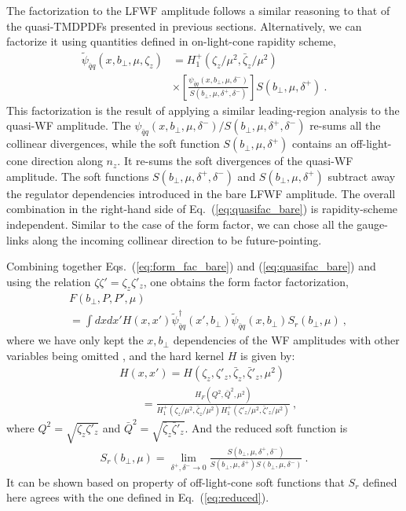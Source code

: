 \documentclass[aps,rmp,reprint,amsmath,amssymb,graphicx,longbibliography]{revtex4-1} %
\newcommand{\nn}{\nonumber}
\begin{document}
The factorization to the LFWF amplitude follows a similar reasoning to that of the quasi-TMDPDFs presented in previous sections.  Alternatively, we can factorize it using quantities defined in on-light-cone rapidity scheme,
\begin{align}\label{eq:quasifac_bare}
	\tilde \psi_{\bar q q}(x,b_\perp,\mu,\zeta_z)&=H^+_1\left(\zeta_z/\mu^2,\bar \zeta_z/\mu^2\right)\\ &\times \left[\frac{\psi_{\bar q q}(x,b_\perp,\mu,\delta^-)}{S(b_\perp,\mu,\delta^+,\delta^-)}\right]S(b_\perp,\mu,\delta^+) \ . \nn
\end{align}
This factorization is the result of applying a similar leading-region analysis to the quasi-WF amplitude. The $\psi_{\bar q q}(x,b_\perp,\mu,\delta^-)/S(b_\perp,\mu,\delta^+,\delta^-)$ re-sums all the collinear divergences, while the soft function $S(b_\perp,\mu,\delta^+)$ contains an off-light-cone direction along ${n_z}$. It re-sums the soft divergences of the quasi-WF amplitude. The soft functions $S(b_\perp,\mu,\delta^+,\delta^-)$ and $S(b_\perp,\mu,\delta^+)$ subtract away the regulator dependencies introduced in the bare LFWF amplitude. The overall combination in the right-hand side of Eq.~(\ref{eq:quasifac_bare}) is rapidity-scheme independent. Similar to the case of the form factor, we can chose all the gauge-links along the incoming collinear direction to be future-pointing.

Combining together Eqs.~(\ref{eq:form_fac_bare}) and (\ref{eq:quasifac_bare}) and using the relation $\zeta \zeta'= \zeta_z \zeta'_z$,
one obtains the form factor factorization,
\begin{align}
	& F(b_\perp,P,P',\mu)\\
	&= \int dx dx' H(x,x')\tilde \psi_{\bar q q}^{\dagger}(x',b_\perp)\tilde \psi_{\bar q q}(x,b_\perp)S_{r}(b_\perp,\mu)\ ,\nn
\end{align}
where we have only kept the $x,b_\perp$ dependencies of the WF amplitudes with other variables being omitted
, and the hard kernel $H$ is given by:
\begin{align}
	&H(x,x')=H(\zeta_z,\zeta'_z,\bar \zeta_z,\bar \zeta'_z,\mu^2)\nonumber \\
	&\qquad=\frac{H_F(Q^2,\bar Q^2,\mu^2)}{H^+_1\left(\zeta_z/\mu^2,\bar \zeta_z/\mu^2\right)H^+_1\left(\zeta'_z/\mu^2,\bar \zeta'_z/\mu^2\right)} \ ,
\end{align}
where $Q^2=\sqrt{\zeta_z\zeta'_z}$ and $\bar Q^2=\sqrt{\bar \zeta_z\bar\zeta'_z}$. And the reduced soft function is
\begin{align}
	S_{r}(b_\perp,\mu)=\lim_{\delta^+,\delta^-\rightarrow 0}\frac{S(b_\perp,\mu,\delta^+,\delta^-)}{S(b_\perp,\mu,\delta^+)S(b_\perp,\mu,\delta^-)} \ .
\end{align}
It can be shown based on property of off-light-cone soft functions that $S_r$ defined here agrees with the one defined in Eq.~(\ref{eq:reduced}).
\end{document}
